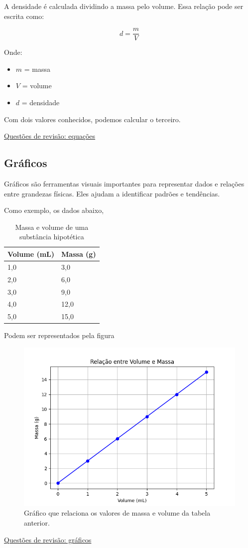 \documentclass[11pt]{article}
\begin{document}
A densidade é calculada dividindo a massa pelo volume. Essa relação pode ser escrita como:

\begin{equation}
d = \frac{m}{V}
\end{equation}

Onde:
\begin{itemize}
\item \(m\) = massa
\item \(V\) = volume
\item \(d\) = densidade
\end{itemize}

Com dois valores conhecidos, podemos calcular o terceiro.

\href{quest-pre-fisica2.org}{Questões de revisão: equações}
\subsection{Gráficos}
\label{sec:org98f015b}
Gráficos são ferramentas visuais importantes para representar dados e relações entre grandezas físicas. Eles ajudam a identificar padrões e tendências.


Como exemplo, os dados abaixo,

\begin{table}[htbp]
\caption{Massa e volume de uma substância hipotética}
\centering
\begin{tabular}{ll}
Volume (mL) & Massa (g)\\
\hline
1,0 & 3,0\\
2,0 & 6,0\\
3,0 & 9,0\\
4,0 & 12,0\\
5,0 & 15,0\\
\end{tabular}
\end{table}

Podem ser representados pela figura

\begin{figure}[htbp]
\centering
\includegraphics[width=.9\linewidth]{graphics/grafico1.png}
\caption{Gráfico que relaciona os valores de massa e volume da tabela anterior.}
\end{figure}

\href{quest-pre-fisica3.org}{Questões de revisão: gráficos} 
\end{document}
